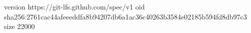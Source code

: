 version https://git-lfs.github.com/spec/v1
oid sha256:2761cac44afeeeddfa8b94207db6a1ac36c40263b3584e02185b594fd8db97c3
size 22000
